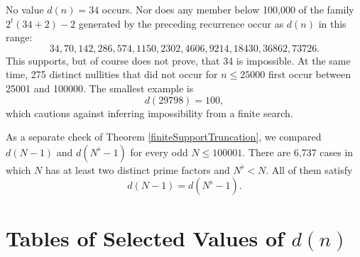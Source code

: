 \documentclass[a4paper]{article}
\begin{document}
	No value $d(n)=34$ occurs.
	Nor does any member below 100,000 of the family $2^t(34+2)-2$ generated by the preceding recurrence occur as $d(n)$ in this range:
	\begin{equation*}
		34,70,142,286,574,1150,2302,4606,9214,18430,36862,73726.
	\end{equation*}
	This supports, but of course does not prove, that 34 is impossible.
	At the same time, 275 distinct nullities that did not occur for $n\leq25000$ first occur between 25001 and 100000.
	The smallest example is
	\begin{equation*}
		d(29798)=100,
	\end{equation*}
	which cautions against inferring impossibility from a finite search.

	As a separate check of Theorem \ref{finiteSupportTruncation}, we compared $d(N-1)$ and $d(N^\flat-1)$ for every odd $N\leq100001$.
	There are 6,737 cases in which $N$ has at least two distinct prime factors and $N^\flat<N$.
	All of them satisfy
	\begin{equation*}
		d(N-1)=d(N^\flat-1).
	\end{equation*}

	\newpage
	\section{Tables of Selected Values of $d(n)$}
\end{document}
